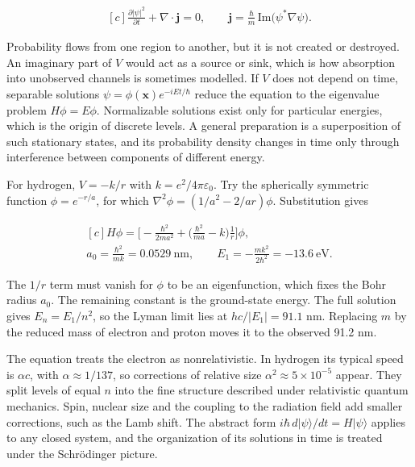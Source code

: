 \documentclass[11pt,oneside]{book}
\newenvironment{centeredalign}{\[\begin{gathered}[c]}{\end{gathered}\]}
\begin{document}
\begin{centeredalign}
\frac{\partial|\psi|^2}{\partial t}+\nabla\cdot\mathbf j=0,\qquad
\mathbf j=\frac{\hbar}{m}\,\mathrm{Im}\big(\psi^*\nabla\psi\big).
\end{centeredalign}

Probability flows from one region to another, but it is not created or destroyed. An imaginary part of \(V\) would act as a source or sink, which is how absorption into unobserved channels is sometimes modelled. If \(V\) does not depend on time, separable solutions \(\psi=\phi(\mathbf x)e^{-iEt/\hbar}\) reduce the equation to the eigenvalue problem \(H\phi=E\phi\). Normalizable solutions exist only for particular energies, which is the origin of discrete levels. A general preparation is a superposition of such stationary states, and its probability density changes in time only through interference between components of different energy.

For hydrogen, \(V=-k/r\) with \(k=e^2/4\pi\varepsilon_0\). Try the spherically symmetric function \(\phi=e^{-r/a}\), for which \(\nabla^2\phi=(1/a^2-2/ar)\phi\). Substitution gives

\begin{centeredalign}
H\phi=\Big[-\frac{\hbar^2}{2ma^2}+\Big(\frac{\hbar^2}{ma}-k\Big)\frac1r\Big]\phi,\\
a_0=\frac{\hbar^2}{mk}=0.0529\ \mathrm{nm},\qquad
E_1=-\frac{mk^2}{2\hbar^2}=-13.6\ \mathrm{eV}.
\end{centeredalign}

The \(1/r\) term must vanish for \(\phi\) to be an eigenfunction, which fixes the Bohr radius \(a_0\). The remaining constant is the ground-state energy. The full solution gives \(E_n=E_1/n^2\), so the Lyman limit lies at \(hc/|E_1|=91.1\) nm. Replacing \(m\) by the reduced mass of electron and proton moves it to the observed 91.2 nm.

The equation treats the electron as nonrelativistic. In hydrogen its typical speed is \(\alpha c\), with \(\alpha\approx1/137\), so corrections of relative size \(\alpha^2\approx5\times10^{-5}\) appear. They split levels of equal \(n\) into the fine structure described under relativistic quantum mechanics. Spin, nuclear size and the coupling to the radiation field add smaller corrections, such as the Lamb shift. The abstract form \(i\hbar\,d|\psi\rangle/dt=H|\psi\rangle\) applies to any closed system, and the organization of its solutions in time is treated under the Schrödinger picture.
\end{document}

